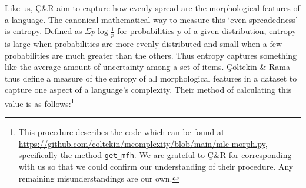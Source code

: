 \documentclass[USenglish]{article}
\begin{document}
Like us, Ç\&R aim to capture how evenly spread are the morphological features of a language.
The canonical mathematical way to measure this `even-spreadedness' is entropy.
Defined as $\Sigma p \log{\frac{1}{p}}$ for probabilities $p$ of a given distribution, entropy is large when probabilities are more evenly distributed and small when a few probabilities are much greater than the others.
Thus entropy captures something like the average amount of uncertainty among a set of items.
Çöltekin \& Rama thus define a measure of the entropy of all morphological features in a dataset to capture one aspect of a language's complexity.
Their method of calculating this value is as follows:\footnote{This procedure describes the code which can be found at \url{https://github.com/coltekin/mcomplexity/blob/main/mlc-morph.py}, specifically the method \texttt{get\_mfh}. We are grateful to Ç\&R for corresponding with us so that we could confirm our understanding of their procedure. Any remaining misunderstandings are our own.}
\end{document}
